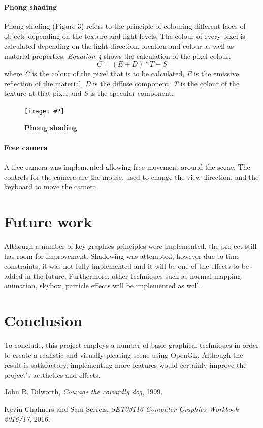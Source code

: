 \documentclass[10pt, a4paper]{article}
\newcommand{\figuremacro}[5]{
    \begin{figure}[#1]
        \centering
        \texttt{[image: \#2]}
        \caption[#3]{\textbf{#3}#4}
        \label{fig:#2}
    \end{figure}
}
\begin{document}
    \paragraph{Phong shading}
    Phong shading (Figure 3) refers to the principle of colouring different faces of objects depending on the texture and light levels. The colour of every pixel is calculated depending on the light direction, location and colour as well as material properties.
    \textit{Equation 4} shows the calculation of the pixel colour.
    \begin{equation}
    C = (E + D) * T + S
    \end{equation}
    where \textit{C} is the colour of the pixel that is to be calculated, \textit{E} is the emissive reflection of the material, \textit{D} is the diffuse component, \textit{T} is the colour of the texture at that pixel and \textit{S} is the specular component.
    \figuremacro{h}{phong.png}{Phong shading}{ }{1.0}

    \paragraph{Free camera} A free camera was implemented allowing free movement around the scene. The controls for the camera are the mouse, used to change the view direction, and the keyboard to move the camera.

    \section{Future work}
	  Although a number of key graphics principles were implemented, the project still has room for improvement.
    Shadowing was attempted, however due to time constraints, it was not fully implemented and it will be one of the effects to be added in the future. Furthermore, other techniques such as normal mapping, animation, skybox, particle effects will be implemented as well.

    \section{Conclusion}
    To conclude, this project employs a number of basic graphical techniques in order to create a realistic and visually pleasing scene using OpenGL. Although the result is satisfactory, implementing more features would certainly improve the project's aesthetics and effects.


%

\begin{thebibliography}{9}

  John R. Dilworth,
  \emph{Courage the cowardly dog},
  1999.

    Kevin Chalmers and Sam Serrels,
    \emph{SET08116 Computer Graphics Workbook 2016/17},
    2016.

\end{thebibliography}
\end{document}

